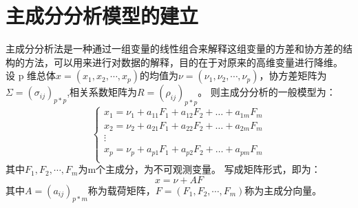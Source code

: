 \documentclass[a4paper]{article}
\begin{document}
\section{主成分分析模型的建立}
主成分分析法是一种通过一组变量的线性组合来解释这组变量的方差和协方差的结构的方法，可以用来进行对数据的解释，目的在于对原来的高维变量进行降维。\cite{AMSA}  \\
\indent 设 p 维总体$x=(x_1,x_2,\cdots,x_p)$的均值为$\nu=(\nu_1,\nu_2,\cdots,\nu_p)$，协方差矩阵为$\Sigma=(\sigma_{ij})_{p*p}$,相关系数矩阵为$R=(\rho_{ij})_{p*p}$。
则主成分分析的一般模型为：
\begin{equation}
\left\{
\begin{aligned}
x_1=\nu_1+a_{11}F_1+a_{12}F_2+\dots+a_{1m}F_m    \\
x_2=\nu_2+a_{21}F_1+a_{22}F_2+\dots+a_{2m}F_m    \\
\vdots                                           \\
x_p=\nu_p+a_{p1}F_1+a_{p2}F_2+\dots+a_{pm}F_m    \\
\end{aligned}
\right.
\end{equation}
其中$F_1,F_2,\cdots,F_m$为m个主成分，为不可观测变量。
写成矩阵形式，即为：
\begin{equation}
x=\nu+AF
\end{equation}
其中$A=(a_{ij})_{p*m}$称为载荷矩阵，$F=(F_1,F_2,\cdots,F_m)$称为主成分向量。
\end{document}

